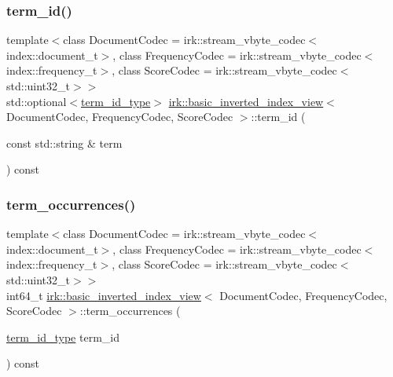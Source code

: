 \mbox{\label{classirk_1_1basic__inverted__index__view_aa7d7b49b3657d589020b4325162f55bf}} 
\subsubsection{\texorpdfstring{term\+\_\+id()}{term\_id()}}
{\footnotesize\ttfamily template$<$class Document\+Codec  = irk\+::stream\+\_\+vbyte\+\_\+codec$<$index\+::document\+\_\+t$>$, class Frequency\+Codec  = irk\+::stream\+\_\+vbyte\+\_\+codec$<$index\+::frequency\+\_\+t$>$, class Score\+Codec  = irk\+::stream\+\_\+vbyte\+\_\+codec$<$std\+::uint32\+\_\+t$>$$>$ \\
std\+::optional$<$\mbox{\hyperlink{classirk_1_1basic__inverted__index__view_a6b272abc76df208ce59bac93810e7331}{term\+\_\+id\+\_\+type}}$>$ \mbox{\hyperlink{classirk_1_1basic__inverted__index__view}{irk\+::basic\+\_\+inverted\+\_\+index\+\_\+view}}$<$ Document\+Codec, Frequency\+Codec, Score\+Codec $>$\+::term\+\_\+id (\begin{DoxyParamCaption}\item[{const std\+::string \&}]{term }\end{DoxyParamCaption}) const\hspace{0.3cm}{\ttfamily [inline]}}

\mbox{\label{classirk_1_1basic__inverted__index__view_ad87994cfa2fd03569e9154966b81a505}} 
\subsubsection{\texorpdfstring{term\+\_\+occurrences()}{term\_occurrences()}}
{\footnotesize\ttfamily template$<$class Document\+Codec  = irk\+::stream\+\_\+vbyte\+\_\+codec$<$index\+::document\+\_\+t$>$, class Frequency\+Codec  = irk\+::stream\+\_\+vbyte\+\_\+codec$<$index\+::frequency\+\_\+t$>$, class Score\+Codec  = irk\+::stream\+\_\+vbyte\+\_\+codec$<$std\+::uint32\+\_\+t$>$$>$ \\
int64\+\_\+t \mbox{\hyperlink{classirk_1_1basic__inverted__index__view}{irk\+::basic\+\_\+inverted\+\_\+index\+\_\+view}}$<$ Document\+Codec, Frequency\+Codec, Score\+Codec $>$\+::term\+\_\+occurrences (\begin{DoxyParamCaption}\item[{\mbox{\hyperlink{classirk_1_1basic__inverted__index__view_a6b272abc76df208ce59bac93810e7331}{term\+\_\+id\+\_\+type}}}]{term\+\_\+id }\end{DoxyParamCaption}) const\hspace{0.3cm}{\ttfamily [inline]}}

